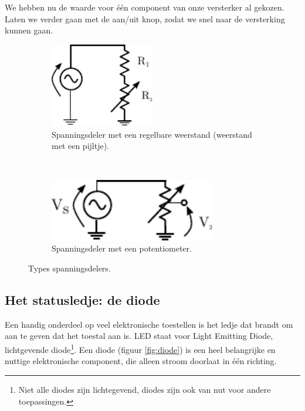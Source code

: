 \documentclass{article}
\begin{document}
			We hebben nu de waarde voor \'e\'en component van onze versterker al gekozen. Laten we verder gaan met de aan/uit knop, zodat we snel naar de versterking kunnen gaan.
			\begin{figure}
				\centering
				\begin{subfigure}[b]{0.45\linewidth}
					\centering
					\includegraphics[width=0.5\textwidth]{regelbareR}
					\caption{Spanningsdeler met een regelbare weerstand (weerstand met een pijltje).}
					\label{subfig:regelbareR}
				\end{subfigure}
				~
				\begin{subfigure}[b]{0.45\linewidth}
					\centering
					\includegraphics[width=0.8\textwidth]{potentiometer.pdf}
					\caption{Spanningsdeler met een potentiometer.}
					\label{subfig:pot}
				\end{subfigure}
			\caption{Types spanningsdelers.}
			\label{fig:vdeler} 
			\end{figure}

		\subsection{Het statusledje: de diode}
			Een handig onderdeel op veel elektronische toestellen is het ledje dat brandt om aan te geven dat het toestal aan is. LED staat voor Light Emitting Diode, lichtgevende diode\footnote{Niet alle diodes zijn lichtegevend, diodes zijn ook van nut voor andere toepassingen.}. Een diode (figuur \ref{fig:diode}) is een heel belangrijke en nuttige elektronische component, die alleen stroom doorlaat in \'e\'en richting.
\end{document}
